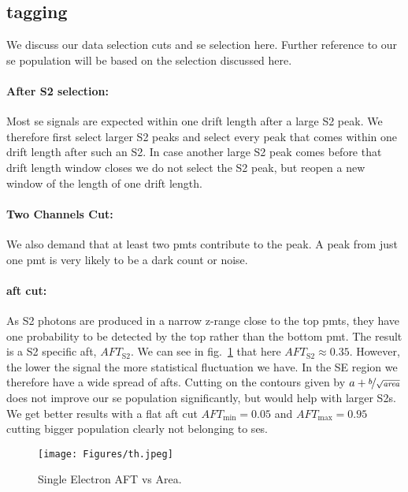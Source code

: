 
\FloatBarrier
\subsection{tagging}
\label{ssec:tagging}
\FloatBarrier


We discuss our data selection cuts and \gls{se} selection here.  Further reference to our \gls{se} population will be based on the selection discussed here.

\paragraph{After S2 selection:} Most \gls{se} signals are expected within one drift length after a large S2 peak.
We therefore first select larger S2 peaks and select every peak that comes within one drift length after such an S2.
In case another large S2 peak comes before that drift length window closes we do not select the S2 peak, but reopen a new window of the length of one drift length.

\paragraph{Two Channels Cut:} We also demand that at least two \gls{pmt}s contribute to the peak.
A peak from just one \gls{pmt} is very likely to be a dark count or noise.

\paragraph{\gls{aft} cut:} As S2 photons are produced in a narrow z-range close to the top \gls{pmt}s, they have one probability to be detected by the top rather than the bottom \gls{pmt}.
The result is a S2 specific \gls{aft}, $ \mathit{AFT}_\mathrm{S2} $.
We can see in fig.~\ref{fig:se-aft} that here $ \mathit{AFT}_\mathrm{S2} \approx 0.35 $.  %
However, the lower the signal the more statistical fluctuation we have.
In the SE region we therefore have a wide spread of \gls{aft}s.
Cutting on the contours given by $ a + \nicefrac{b}{\sqrt{\mathit{area}}} $ does not improve our \gls{se} population significantly, but would help with larger S2s.
We get better results with a flat \gls{aft} cut $ \mathit{AFT}_\mathrm{min} = 0.05 $ and $ \mathit{AFT}_\mathrm{max} = 0.95 $ cutting bigger population clearly not belonging to \gls{se}s.

\begin{figure}
    \centering
    \texttt{[image: Figures/th.jpeg]}  %
    \caption[AFT vs Area Single Electrons]{
        Single Electron AFT vs Area.
    }
    \label{fig:se-aft}
\end{figure}

